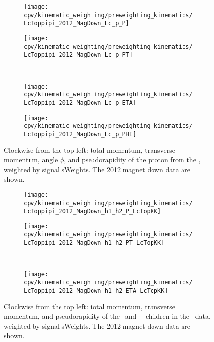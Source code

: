 \begin{figure}
  \begin{subfigure}[b]{0.4\textwidth}
    \texttt{[image: cpv/kinematic\_weighting/preweighting\_kinematics/LcToppipi\_2012\_MagDown\_Lc\_p\_P]}
    \label{fig:cpv:kinematic_weighting:pre:Lc_p:P}
  \end{subfigure}
  \begin{subfigure}[b]{0.4\textwidth}
    \texttt{[image: cpv/kinematic\_weighting/preweighting\_kinematics/LcToppipi\_2012\_MagDown\_Lc\_p\_PT]}
    \label{fig:cpv:kinematic_weighting:pre:Lc_p:PT}
  \end{subfigure}\\
  \begin{subfigure}[b]{0.4\textwidth}
    \texttt{[image: cpv/kinematic\_weighting/preweighting\_kinematics/LcToppipi\_2012\_MagDown\_Lc\_p\_ETA]}
    \label{fig:cpv:kinematic_weighting:pre:Lc_p:ETA}
  \end{subfigure}
  \begin{subfigure}[b]{0.4\textwidth}
    \texttt{[image: cpv/kinematic\_weighting/preweighting\_kinematics/LcToppipi\_2012\_MagDown\_Lc\_p\_PHI]}
    \label{fig:cpv:kinematic_weighting:pre:Lc_p:PHI}
  \end{subfigure}
  \caption{%
    Clockwise from the top left: total momentum, transverse momentum, angle
    $\phi$, and pseudorapidity of the proton from the \PLambdac, weighted by
    signal sWeights.
    The 2012 magnet down data are shown.
  }
  \label{fig:cpv:kinematic_weighting:pre:Lc_p}
\end{figure}

\begin{figure}
  \begin{subfigure}[b]{0.5\textwidth}
    \centering
    \texttt{[image: cpv/kinematic\_weighting/preweighting\_kinematics/LcToppipi\_2012\_MagDown\_h1\_h2\_P\_LcTopKK]}
    \label{fig:cpv:kinematic_weighting:pre:pKK_h1h2:P}
  \end{subfigure}
  \begin{subfigure}[b]{0.5\textwidth}
    \centering
    \texttt{[image: cpv/kinematic\_weighting/preweighting\_kinematics/LcToppipi\_2012\_MagDown\_h1\_h2\_PT\_LcTopKK]}
    \label{fig:cpv:kinematic_weighting:pre:pKK_h1h2:PT}
  \end{subfigure}\\
  \begin{subfigure}[b]{\textwidth}
    \centering
    \texttt{[image: cpv/kinematic\_weighting/preweighting\_kinematics/LcToppipi\_2012\_MagDown\_h1\_h2\_ETA\_LcTopKK]}
    \label{fig:cpv:kinematic_weighting:pre:pKK_h1h2:ETA}
  \end{subfigure}
  \caption{%
    Clockwise from the top left: total momentum, transverse momentum, and
    pseudorapidity of the \PKminus\ and \PKplus\ \PLambdac\ children in the
    \pKK\ data, weighted by signal sWeights.
    The 2012 magnet down data are shown.
  }
  \label{fig:cpv:kinematic_weighting:pre:pKK_h1h2}
\end{figure}

